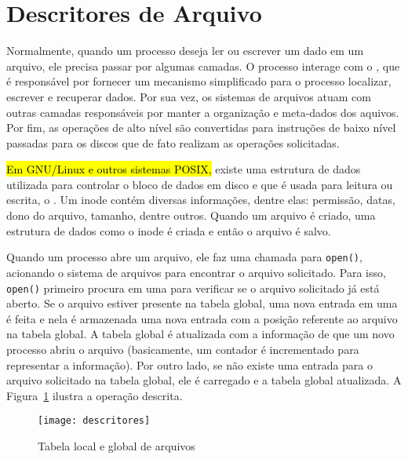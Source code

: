 \section{Descritores de Arquivo}

 Normalmente, quando um processo deseja ler ou escrever um
dado em um arquivo, ele precisa passar por algumas camadas. O
processo interage com o , que é responsável
por fornecer um mecanismo simplificado para o processo localizar, escrever e
recuperar dados. Por sua vez, os sistemas de arquivos atuam com outras camadas
responsáveis por manter a organização e meta-dados dos aquivos. Por fim,
as operações de alto nível são convertidas para instruções de baixo nível
passadas para os discos que de fato realizam as operações solicitadas.

\hl{Em GNU/Linux e outros sistemas POSIX,} existe uma estrutura de dados utilizada para controlar o bloco de dados em disco e que é
usada para leitura ou escrita, o . Um inode contém diversas
informações, dentre elas: permissão, datas, dono do arquivo, tamanho, dentre
outros. Quando um arquivo é criado, uma estrutura de dados como o inode é
criada e então o arquivo é salvo.

Quando um processo abre um arquivo, ele faz uma chamada para \texttt{open()},
acionando o sistema de arquivos para encontrar o arquivo solicitado.
Para isso, \texttt{open()} primeiro procura em uma  para verificar se o arquivo solicitado já está aberto. Se o
arquivo estiver presente na tabela global, uma nova entrada em uma
 é feita e nela é
armazenada uma nova entrada com a posição referente ao arquivo na tabela
global. A tabela global é atualizada com a informação de que um novo processo
abriu o arquivo (basicamente, um contador é incrementado para representar a
informação). Por outro lado, se não existe uma entrada para o arquivo solicitado
na tabela global, ele é carregado e a tabela global atualizada. A
Figura~\ref{fig:descritores} ilustra a operação descrita.
 
\begin{figure}[!h]
  \centering
  \texttt{[image: descritores]} 
  \caption{Tabela local e global de arquivos}
  \label{fig:descritores} 
\end{figure}

